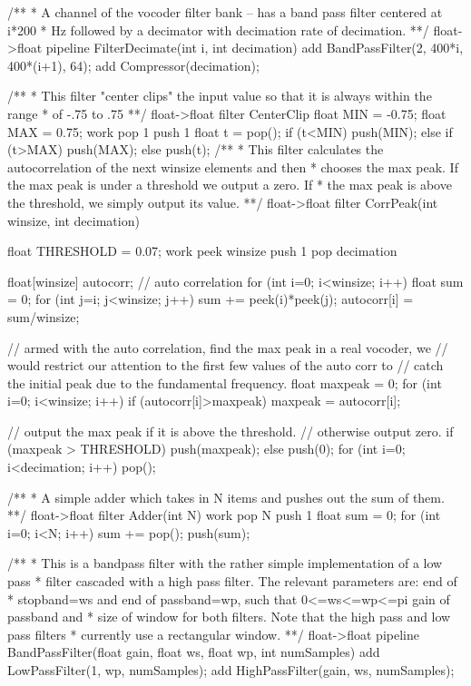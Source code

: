 /** 
 * A channel of the vocoder filter bank -- has a band pass filter centered at i*200
 * Hz followed by a decimator with decimation rate of decimation.
 **/
float->float pipeline FilterDecimate(int i, int decimation) {
    add BandPassFilter(2, 400*i, 400*(i+1), 64); 
    add Compressor(decimation);
}

/** 
 * This filter "center clips" the input value so that it is always within the range
 * of -.75 to .75
 **/
float->float filter CenterClip {
    float MIN = -0.75;
    float MAX =  0.75;
    work pop 1 push 1 {
        float t = pop();
        if (t<MIN) {
            push(MIN); 
        } else if (t>MAX) {
            push(MAX);
        } else {
            push(t);
        }
    }
}
/** 
 * This filter calculates the autocorrelation of the next winsize elements and then
 * chooses the max peak. If the max peak is under a threshold we output a zero. If
 * the max peak is above the threshold, we simply output its value.
 **/
float->float filter CorrPeak(int winsize, int decimation) {
    float THRESHOLD = 0.07;
    work peek winsize push 1 pop decimation {
        float[winsize] autocorr; // auto correlation
        for (int i=0; i<winsize; i++) {
            float sum = 0;
            for (int j=i; j<winsize; j++) {
                sum += peek(i)*peek(j);
            }
            autocorr[i] = sum/winsize;
        }

        // armed with the auto correlation, find the max peak in a real vocoder, we
        // would restrict our attention to the first few values of the auto corr to
        // catch the initial peak due to the fundamental frequency.
        float maxpeak = 0;
        for (int i=0; i<winsize; i++) {
            if (autocorr[i]>maxpeak) {
                maxpeak = autocorr[i];
            }
        }
    
        // output the max peak if it is above the threshold.
        // otherwise output zero.
        if (maxpeak > THRESHOLD) {
            push(maxpeak);
        } else {
            push(0);
        }
        for (int i=0; i<decimation; i++) {
            pop();
        }
    }
}          
/**
 * A simple adder which takes in N items and pushes out the sum of them.
 **/
float->float filter Adder(int N) {
    work pop N push 1 {
        float sum = 0;
        for (int i=0; i<N; i++) {
            sum += pop();
        }
        push(sum);
    }
}

/**
 * This is a bandpass filter with the rather simple implementation of a low pass
 * filter cascaded with a high pass filter. The relevant parameters are: end of
 * stopband=ws and end of passband=wp, such that 0<=ws<=wp<=pi gain of passband and
 * size of window for both filters. Note that the high pass and low pass filters
 * currently use a rectangular window.
 **/
float->float pipeline BandPassFilter(float gain, float ws, float wp, int numSamples) {
    add LowPassFilter(1, wp, numSamples);
    add HighPassFilter(gain, ws, numSamples);
}

